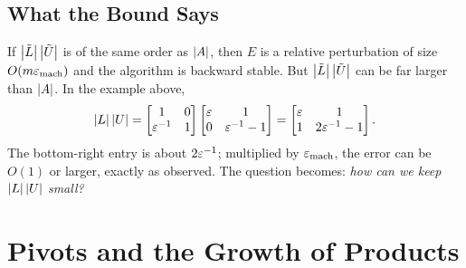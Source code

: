 \subsection{What the Bound Says}

If $\left\lvert \tilde{L} \right\rvert\left\lvert \tilde{U} \right\rvert$ is of the same order as $\left\lvert A \right\rvert$, then $E$ is a relative perturbation of size $O(m\varepsilon_{\mathrm{mach}})$ and the algorithm is backward stable. But $\left\lvert \tilde{L} \right\rvert\left\lvert \tilde{U} \right\rvert$ can be far larger than $\left\lvert A \right\rvert$. In the example above,
\begin{equation}
  \left\lvert L \right\rvert\left\lvert U \right\rvert = \begin{bmatrix} 1 & 0 \\ \varepsilon^{-1} & 1 \end{bmatrix}\begin{bmatrix} \varepsilon & 1 \\ 0 & \varepsilon^{-1} - 1 \end{bmatrix} = \begin{bmatrix} \varepsilon & 1 \\ 1 & 2\varepsilon^{-1} - 1 \end{bmatrix}.
\end{equation}
The bottom-right entry is about $2\varepsilon^{-1}$; multiplied by $\varepsilon_{\mathrm{mach}}$, the error can be $O(1)$ or larger, exactly as observed. The question becomes: \emph{how can we keep $\left\lvert L \right\rvert\left\lvert U \right\rvert$ small?}

\section{Pivots and the Growth of Products}


